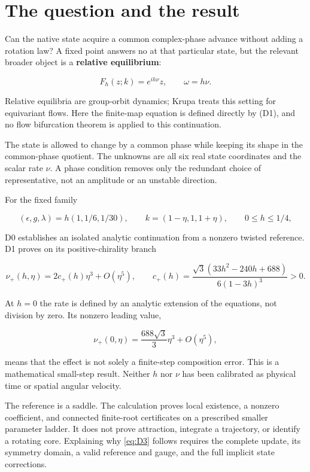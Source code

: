 \documentclass[11pt,a4paper]{article}
\begin{document}
\section{The question and the result}

Can the native state acquire a common complex-phase advance without adding a rotation law? A fixed point answers no at that particular state, but the relevant broader object is a \textbf{relative equilibrium}:

\[
F_h(z;k)=e^{ih\nu}z,\qquad \omega=h\nu.
\tag{D1}\label{eq:D1}
\]

Relative equilibria are group-orbit dynamics; Krupa \cite{Krupa} treats this setting for equivariant flows. Here the finite-map equation is defined directly by (D1), and no flow bifurcation theorem is applied to this continuation.

The state is allowed to change by a common phase while keeping its shape in the common-phase quotient. The unknowns are all six real state coordinates and the scalar rate \(\nu\). A phase condition removes only the redundant choice of representative, not an amplitude or an unstable direction.

For the fixed family

\[
(\epsilon,g,\lambda)=h(1,1/6,1/30),\qquad
k=(1-\eta,1,1+\eta),\qquad 0\le h\le1/4,
\tag{D2}\label{eq:D2}
\]

D0 establishes an isolated analytic continuation from a nonzero twisted reference. D1 proves on its positive-chirality branch

\[
\boxed{\nu_+(h,\eta)=2c_+(h)\eta^3+O(\eta^5)},\qquad
\boxed{c_+(h)=\frac{\sqrt3(33h^2-240h+688)}{6(1-3h)^3}>0.}
\tag{D3}\label{eq:D3}
\]

At \(h=0\) the rate is defined by an analytic extension of the equations, not division by zero. Its nonzero leading value,

\[
\nu_+(0,\eta)=\frac{688\sqrt3}{3}\eta^3+O(\eta^5),
\tag{D4}\label{eq:D4}
\]

means that the effect is not solely a finite-step composition error. This is a mathematical small-step result. Neither \(h\) nor \(\nu\) has been calibrated as physical time or spatial angular velocity.

The reference is a saddle. The calculation proves local existence, a nonzero coefficient, and connected finite-root certificates on a prescribed smaller parameter ladder. It does not prove attraction, integrate a trajectory, or identify a rotating core. Explaining why \eqref{eq:D3} follows requires the complete update, its symmetry domain, a valid reference and gauge, and the full implicit state corrections.
\end{document}
